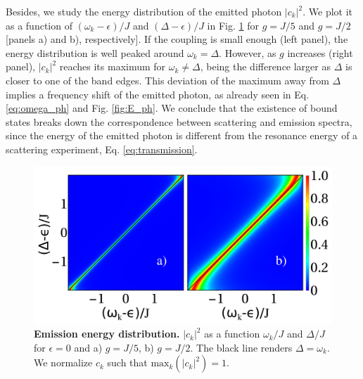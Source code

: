\documentclass[aps,pra,twocolumn,floatfix,superscriptaddress]{revtex4-1}%
\begin{document}
Besides, we study the energy distribution of the emitted photon $|c_k|^2$. We plot it as a function of $(\omega_k-\epsilon)/J$ and $(\Delta-\epsilon)/J$ in Fig. \ref{fig:c_k} for $g=J/5$ and $g=J/2$ [panels a) and b), respectively]. If the coupling is small enough (left panel), the energy distribution is well peaked around $\omega_k=\Delta$. However, as $g$ increases (right panel), $|c_k|^2$ reaches its maximum for $\omega_k\neq\Delta$, being the difference larger as $\Delta$ is closer to one of the band edges. This deviation of the maximum away from $\Delta$ implies a frequency shift of the emitted photon, as already seen in Eq. \eqref{eq:omega_ph} and Fig. \ref{fig:E_ph}. {\color{blue}We conclude that the existence of bound states breaks down the correspondence between scattering and emission spectra, since the energy of the emitted photon is different from the resonance energy of a scattering experiment, Eq. \eqref{eq:transmission}.}

\begin{figure}[thb!]
\includegraphics[width=1.0\columnwidth]{e_vs_w_Delta_g_0_2_0_5.pdf}
\caption{{\bf Emission energy distribution.} $|c_k|^2$ as a function $\omega_k/J$ and $\Delta/J$ for $\epsilon=0$ and a) $g=J/5$, b) $g=J/2$. The black line renders $\Delta=\omega_k$. We normalize $c_k$ such that $\text{max}_k(|c_k|^2)=1$.}\label{fig:c_k}
\end{figure}
\end{document}
